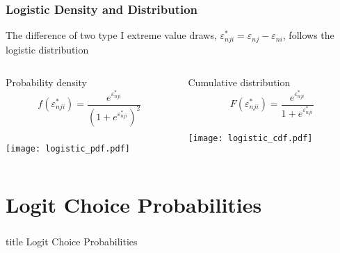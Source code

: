 \documentclass{beamer}\usepackage[]{graphicx}\usepackage[]{color}
\begin{document}
\begin{frame}\frametitle{Logistic Density and Distribution}
    The difference of two type I extreme value draws, $\varepsilon_{nji}^* = \varepsilon_{nj} - \varepsilon_{ni}$, follows the logistic distribution
    \begin{columns}
		\begin{column}{0.5\textwidth}
			\begin{center}
				Probability density \\
				\vspace{-4ex}
				$$f(\varepsilon_{nji}^*) = \frac{e^{\varepsilon_{nji}^*}}{\left( 1 + e^{\varepsilon_{nji}^*} \right)^2}$$ \\
				\vspace{-2ex}
				\texttt{[image: logistic\_pdf.pdf]}      
			\end{center}
		\end{column}
		\begin{column}{0.5\textwidth}
    		\begin{center}
     			Cumulative distribution \\
     			\vspace{-4ex}
     			$$F(\varepsilon_{nji}^*) = \frac{e^{\varepsilon_{nji}^*}}{1 + e^{\varepsilon_{nji}^*}}$$ \\
     			\vspace{0ex}
				\texttt{[image: logistic\_cdf.pdf]}          
     		\end{center}
		\end{column}
	\end{columns}
\end{frame}

\section{Logit Choice Probabilities}
\label{probs}
\begin{frame}\frametitle{}
    \vfill
    \centering
    \begin{beamercolorbox}[center]{title}
        \Large Logit Choice Probabilities
    \end{beamercolorbox}
    \vfill
\end{frame}
\end{document}
